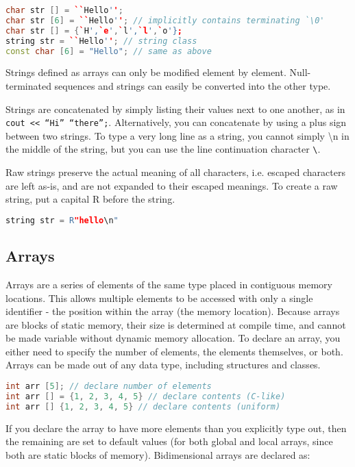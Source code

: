 \documentclass[10pt]{article}
\begin{document}
\begin{lstlisting}[language=C++]
char str [] = ``Hello''; 
char str [6] = ``Hello''; // implicitly contains terminating `\0'
char str [] = {`H',`e',`l',`l',`o'};
string str = ``Hello''; // string class
const char [6] = "Hello"; // same as above
\end{lstlisting}

Strings defined as arrays can only be modified element by element. Null-terminated sequences and strings can easily be converted into the other type.

Strings are concatenated by simply listing their values next to one another, as in \texttt{cout << ``Hi'' ``there'';}. Alternatively, you can concatenate by using a plus sign between two strings. To type a very long line as a string, you cannot simply \textbackslash n in the middle of the string, but you can use the line continuation character \texttt{\textbackslash}.

Raw strings preserve the actual meaning of all characters, i.e. escaped characters are left as-is, and are not expanded to their escaped meanings. To create a raw string, put a capital R before the string.

\begin{lstlisting}[language=C++]
string str = R"hello\n"
\end{lstlisting}

\subsection{Arrays}

Arrays are a series of elements of the same type placed in contiguous memory locations. This allows multiple elements to be accessed with only a single identifier - the position within the array (the memory location). Because arrays are blocks of static memory, their size is determined at compile time, and cannot be made variable without dynamic memory allocation. To declare an array, you either need to specify the number of elements, the elements themselves, or both. Arrays can be made out of any data type, including structures and classes.

\begin{lstlisting}[language=C++]
int arr [5]; // declare number of elements
int arr [] = {1, 2, 3, 4, 5} // declare contents (C-like)
int arr [] {1, 2, 3, 4, 5} // declare contents (uniform)
\end{lstlisting}

If you declare the array to have more elements than you explicitly type out, then the remaining are set to default values (for both global and local arrays, since both are static blocks of memory). Bidimensional arrays are declared as:
\end{document}
